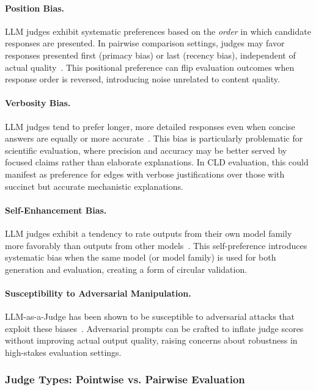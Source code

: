 \paragraph{Position Bias.} LLM judges exhibit systematic preferences based on the \textit{order} in which candidate responses are presented. In pairwise comparison settings, judges may favor responses presented first (primacy bias) or last (recency bias), independent of actual quality~\citep{zheng2024judging}. This positional preference can flip evaluation outcomes when response order is reversed, introducing noise unrelated to content quality.

\paragraph{Verbosity Bias.} LLM judges tend to prefer longer, more detailed responses even when concise answers are equally or more accurate~\citep{zheng2024judging, li2024llmsjudges}. This bias is particularly problematic for scientific evaluation, where precision and accuracy may be better served by focused claims rather than elaborate explanations. In CLD evaluation, this could manifest as preference for edges with verbose justifications over those with succinct but accurate mechanistic explanations.

\paragraph{Self-Enhancement Bias.} LLM judges exhibit a tendency to rate outputs from their own model family more favorably than outputs from other models~\citep{li2024llmsjudges}. This self-preference introduces systematic bias when the same model (or model family) is used for both generation and evaluation, creating a form of circular validation.

\paragraph{Susceptibility to Adversarial Manipulation.} LLM-as-a-Judge has been shown to be susceptible to adversarial attacks that exploit these biases~\citep{shi2024optimization, li2024llmsjudges}. Adversarial prompts can be crafted to inflate judge scores without improving actual output quality, raising concerns about robustness in high-stakes evaluation settings.

\subsubsection{Judge Types: Pointwise vs. Pairwise Evaluation}

